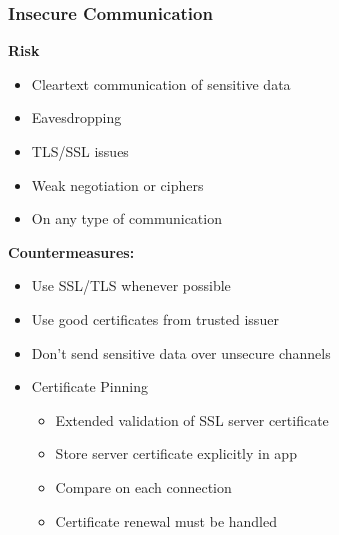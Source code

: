 \subsubsection{Insecure Communication}
\textbf{Risk}
\begin{itemize}
    \item Cleartext communication of sensitive data
    \item Eavesdropping
    \item TLS/SSL issues
    \item Weak negotiation or ciphers
    \item On any type of communication
\end{itemize}
\textbf{Countermeasures:}
\begin{itemize}
    \item Use SSL/TLS whenever possible
    \item Use good certificates from trusted issuer
    \item Don't send sensitive data over unsecure channels
    \item Certificate Pinning
    \begin{itemize}
        \item Extended validation of SSL server certificate
        \item Store server certificate explicitly in app
        \item Compare on each connection
        \item Certificate renewal must be handled
    \end{itemize}
\end{itemize}

